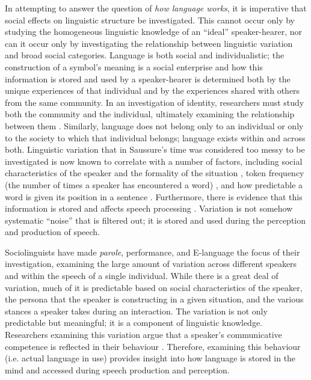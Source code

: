 In attempting to answer the question of \textit{how language works}, it is imperative that social effects on linguistic structure be investigated.  This cannot occur only by studying the homogeneous linguistic knowledge of an ``ideal'' speaker-hearer, nor can it occur only by investigating the relationship between linguistic variation and broad social categories.  Language is both social and individualistic; the construction of a symbol's meaning is a social enterprise and how this information is stored and used by a speaker-hearer is determined both by the unique experiences of that individual and by the experiences shared with others from the same community.  In an investigation of identity, researchers must study both the community and the individual, ultimately examining the relationship between them \cite[146]{wenger1998}.  Similarly, language does not belong only to an individual or only to the society to which that individual belongs; language exists within and across both.  Linguistic variation that in Saussure's time was considered too messy to be investigated is now known to correlate with a number of factors, including social characteristics of the speaker and the formality of the situation \cite{labov1972sociolingpatterns}, token frequency (the number of times a speaker has encountered a word) \cite{bybee2002-lvc}, and  how predictable a word is given its position in a sentence \cite{jurafskyetal2002}. Furthermore, there is evidence that this information is stored and affects speech processing \cite{strand1999,jurafsky2003}.  Variation is not somehow systematic ``noise'' that is filtered out; it is stored and used during the perception and production of speech.

Sociolinguists have made \textit{parole}, performance, and E-language the focus of their investigation, examining the large amount of variation across different speakers and within the speech of a single individual.  While there is a great deal of variation, much of it is predictable based on social characteristics of the speaker, the persona that the speaker is constructing in a given situation, and the various stances a speaker takes during an interaction.  The variation is not only predictable but meaningful; it is a component of linguistic knowledge.  Researchers examining this variation argue that a speaker's communicative competence is reflected in their behaviour \cite{hymes1972}.  Therefore, examining this behaviour (i.e. actual language in use) provides insight into how language is stored in the mind and accessed during speech production and perception.  

